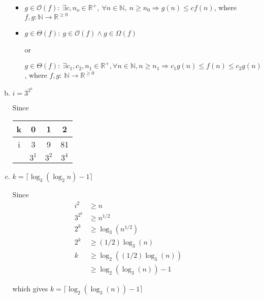 \documentclass[12pt]{article}
\begin{document}
\begin{enumerate}[1.]
\begin{enumerate}[a)]
\begin{itemize}
            \item

            $g \in \mathcal{O}(f):\:\exists c,n_o \in \mathbb{R}^{+},\:\forall n \in
            \mathbb{N},\:n \geq n_0 \Rightarrow g(n) \leq cf(n)$, where $f,g:\mathbb{N} \to \mathbb{R}^{\geq 0}$

            \item

            $g \in \Theta(f):\: g \in \mathcal{O}(f) \land g \in \Omega(f)$

            or

            $g \in \Theta(f):\:\exists c_1,c_2,n_1 \in \mathbb{R}^{+}, \forall n \in \mathbb{N}, n \geq n_1
            \Rightarrow c_1g(n) \leq f(n) \leq c_2g(n)$, where $f,g:\:\mathbb{N} \to \mathbb{R}^{\geq 0}$
        \end{itemize}

        \item $i = 3^{2^k}$

        \bigskip

        Since

        \bigskip

        \begin{tabular}{|c|c|c|c|}
            \hline
            k & 0 & 1 & 2\\
            \hline
            i & 3 & 9 & 81\\
            \hline
            & $3^1$ & $3^2$ & $3^4$\\
            \hline
        \end{tabular}

        \item $k = \lceil \log_3(\log_2 n) - 1\rceil$

        \bigskip

        Since
        \setcounter{equation}{0}
        \begin{align}
            i^2 &\geq n\\
            3^{2^k} &\geq n^{1/2}\\
            2^k &\geq \log_3(n^{1/2})\\
            2^k &\geq (1/2)\log_3(n)\\
            k &\geq \log_2((1/2)\log_3(n))\\
            &\geq \log_2(\log_3(n)) - 1
        \end{align}

        \bigskip

        which gives $k = \lceil \log_2(\log_3(n)) - 1 \rceil$
    \end{enumerate}
\end{enumerate}
\end{document}
